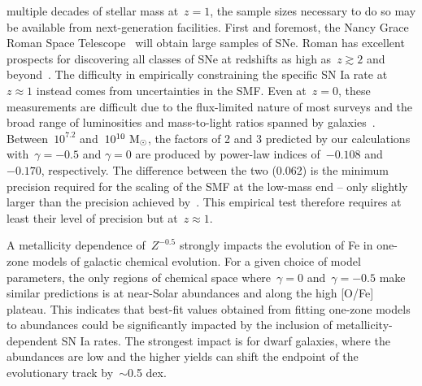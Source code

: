 \documentclass[ms.tex]{subfiles}
\begin{document}
multiple decades of stellar mass at~$z = 1$, the sample sizes necessary to do
so may be available from next-generation facilities.
First and foremost, the Nancy Grace Roman Space Telescope~\citep{Spergel2013,
Spergel2015} will obtain large samples of SNe.
Roman has excellent prospects for discovering all classes of SNe at redshifts
as high as~$z \gtrsim 2$ and beyond~\citep{Petrushevska2016}.
The difficulty in empirically constraining the specific SN Ia rate at
$z \approx 1$ instead comes from uncertainties in the SMF.
Even at~$z = 0$, these measurements are difficult due to the flux-limited
nature of most surveys and the broad range of luminosities and mass-to-light
ratios spanned by galaxies~\citep[see the discussion in][]{Weigel2016}.
Between~$10^{7.2}$ and~$10^{10}~\text{M}_\odot$, the factors of 2 and 3 predicted by our
calculations with~$\gamma = -0.5$ and $\gamma = 0$ are produced by power-law
indices of~$-0.108$ and~$-0.170$, respectively.
The difference between the two (0.062) is the minimum precision required for
the scaling of the SMF at the low-mass end -- only slightly larger than the
precision achieved by~\citet[][$\pm 0.05$, see their Fig. 13]{Baldry2012}.
This empirical test therefore requires at least their level of precision but
at~$z \approx 1$.
\par
A metallicity dependence of~$Z^{-0.5}$ strongly impacts the evolution of Fe
in one-zone models of galactic chemical evolution.
For a given choice of model parameters, the only regions of chemical space
where~$\gamma = 0$ and~$\gamma = -0.5$ make similar predictions is at
near-Solar abundances and along the high [O/Fe] plateau.
This indicates that best-fit values obtained from fitting one-zone models to
abundances could be significantly impacted by the inclusion of
metallicity-dependent SN Ia rates.
The strongest impact is for dwarf galaxies, where the abundances are low and
the higher yields can shift the endpoint of the evolutionary track by~$\sim$0.5
dex.
\end{document}
